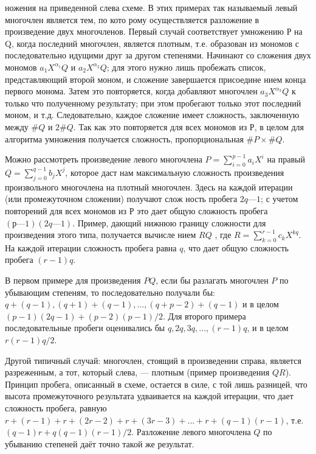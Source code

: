 \noindent
ножения на приведенной сле­ва схеме. В этих примерах так называемый левый много­член является тем, по кото­
рому осуществляется разложе­ние в произведение двух мно­гочленов. Первый случай со­ответствует умножению Р на Q, когда последний многочлен, является плотным, т.е. образо­ван из мономов с последова­тельно идущими друг за другом степенями. Начинают со сложения двух
мономов $a_{1}X^{\alpha _1}Q$ и $a_{2}X^{\alpha _2}Q$; для этого нужно лишь пробежать список,
представляющий второй моном, и сложение завершается присоедине­
нием конца первого монома. Затем это повторяется, когда добавляют
многочлен $a_{3}X^{\alpha _3}Q$  к только что полученному результату; при этом пробегают только этот последний моном, и т.д. Следовательно, каждое
сложение имеет сложность, заключенную между $\#Q$ и $2\#Q$. Так как это
повторяется для всех мономов из $Р$, в целом для алгоритма умножения
получается сложность, пропорциональная $\#P \times \#Q$.
\par Можно рассмотреть произведение левого многочлена $ P =\sum^{p-1}_{i=0}a_{i}X^i$ на правый $Q =\sum^{q-1}_{j=0}b_{j}X^{j} $, которое даст нам максимальную сложность
произведения произвольного многочлена на плотный многочлен. Здесь
на каждой итерации (или промежуточном сложении) получают слож­
ность пробега $2q — 1$; с учетом повторений для всех мономов из $Р$ это дает общую сложность пробега $(р— 1)(2q — 1)$. Пример, дающий нижнюю
границу сложности для произведения этого типа, получается вычисле­
нием $RQ$ , где $R =\sum^{r-1}_{k=0}c_{k}X^{kq}$. На каждой итерации сложность пробега
равна $q$, что дает общую сложность пробега $(r - 1)q$.
\par В первом примере для произведения $PQ$, если бы разлагать мно­гочлен $P$ по убывающим степеням, то последовательно получали бы:$q + (q - 1), (q + 1) + (q - 1), ..., (q + p - 2) + (q - 1)$ и в целом $(p - 1)(2q - 1) + (p - 2)(p - 1)/2 $. Для второго примера последовательные пробеги
оценивались бы $q, 2q, 3q, ..., (r - 1)q$, и в целом $r(r - 1)q/2$.
\par Другой типичный случай: многочлен, стоящий в произведении спра­ва, является разреженным, а тот, который слева, — плотным (пример
произведения $QR$). Принцип пробега, описанный в схеме, остается в
силе, с той лишь разницей, что высота промежуточного результата
удваивается на каждой итерации, что дает сложность пробега, равную
$r + (r - 1) + r + (2r - 2) + r + (3r - 3) + ... + r + (q - 1)(r - 1)$, т.е. $(q - 1)r + q(q - 1)(r - 1)/2$. Разложение левого многочлена $Q$ по убыванию степеней даёт точно такой же результат.
 
 
